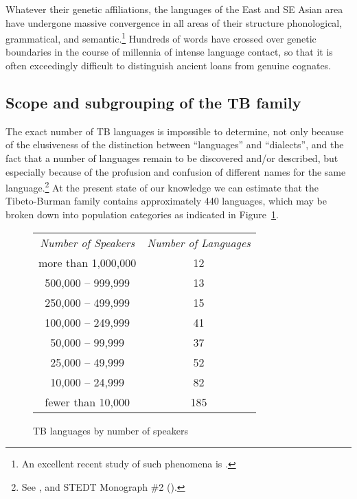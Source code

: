 Whatever their genetic affiliations, the languages of the East and SE Asian area have undergone massive convergence in all areas of their structure  phonological, grammatical, and semantic.\footnote{An excellent recent study of such phenomena is \citealt{TK-LCCGL}.}  Hundreds of words have crossed over genetic boundaries in the course of millennia of intense language contact, so that it is often exceedingly difficult to distinguish ancient loans from genuine cognates.

\subsection{Scope and subgrouping of the TB family}

The exact number of TB languages is impossible to determine, not only because of the elusiveness of the distinction between “languages” and “dialects”, and the fact that a number of languages remain to be discovered and/or described, but especially because of the profusion and confusion of different names for the same language.\footnote{See \citealt{JAM-LDTB}, and STEDT Monograph \#2 (\citealt{JAM-LDTB2}).} At the present state of our knowledge we can estimate that the Tibeto-Burman family contains approximately 440 languages, which may be broken down into population categories as indicated in Figure~\ref{fig:tb_pops}.

\begin{figure}[h!]
\centering
\begin{tabular}{c c}
\textit{Number of Speakers} & \textit{Number of Languages}\\
more than 1,000,000 & 12\\
500,000 – 999,999 & 13\\
250,000 – 499,999 & 15\\
100,000 – 249,999 & 41\\
50,000 – 99,999 & 37\\
25,000 – 49,999 & 52\\
10,000 – 24,999 & 82\\
fewer than 10,000 & 185\\
\end{tabular}
\caption{TB languages by number of speakers\protect\footnotemark}
\label{fig:tb_pops}
\end{figure}

